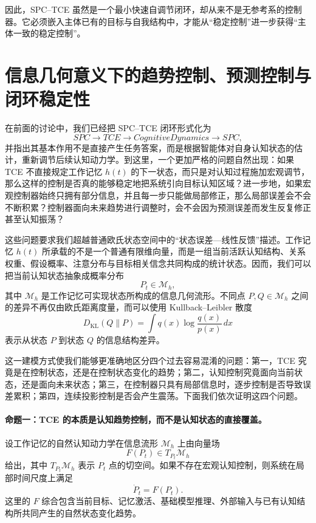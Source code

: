 因此，SPC--TCE 虽然是一个最小快速自调节闭环，却从来不是无参考系的控制器。它必须嵌入主体已有的目标与自我结构中，才能从``稳定控制''进一步获得``主体一致的稳定控制''。

\section{信息几何意义下的趋势控制、预测控制与闭环稳定性}
\label{sec:spc-tce-information-geometric-stability}

在前面的讨论中，我们已经把 SPC--TCE 闭环形式化为
\[
SPC
\rightarrow
TCE
\rightarrow
CognitiveDynamics
\rightarrow
SPC,
\]
并指出其基本作用不是直接产生任务答案，而是根据智能体对自身认知状态的估计，重新调节后续认知动力学。到这里，一个更加严格的问题自然出现：如果 TCE 不直接规定工作记忆 $h(t)$ 的下一状态，而只是对认知过程施加宏观调节，那么这样的控制是否真的能够稳定地把系统引向目标认知区域？进一步地，如果宏观控制器始终只拥有部分信息，并且每一步只能做局部修正，那么局部误差会不会不断积累？控制器面向未来趋势进行调整时，会不会因为预测误差而发生反复修正甚至认知振荡？

这些问题要求我们超越普通欧氏状态空间中的``状态误差---线性反馈''描述。工作记忆 $h(t)$ 所承载的不是一个普通有限维向量，而是一组当前活跃认知结构、关系权重、假设概率、注意分布与目标相关信念共同构成的统计状态。因而，我们可以把当前认知状态抽象成概率分布
\[
P_t\in\mathcal{M}_{h},
\]
其中 $\mathcal{M}_{h}$ 是工作记忆可实现状态所构成的信息几何流形。不同点 $P,Q\in\mathcal{M}_{h}$ 之间的差异不再仅由欧氏距离度量，而可以使用 Kullback--Leibler 散度
\[
D_{\mathrm{KL}}(Q\|P)
=
\int
q(x)
\log
\frac{q(x)}{p(x)}
\,dx
\]
表示从状态 $P$ 到状态 $Q$ 的信息结构差异。

这一建模方式使我们能够更准确地区分四个过去容易混淆的问题：第一，TCE 究竟是在控制状态，还是在控制状态变化的趋势；第二，认知控制究竟面向当前状态，还是面向未来状态；第三，在控制器只具有局部信息时，逐步控制是否导致误差累积；第四，连续投影控制是否会产生震荡。下面我们依次证明这四个问题。

\paragraph{命题一：TCE 的本质是认知趋势控制，而不是认知状态的直接覆盖。}

设工作记忆的自然认知动力学在信息流形 $\mathcal{M}_{h}$ 上由向量场
\[
F(P_t)
\in
T_{P_t}\mathcal{M}_{h}
\]
给出，其中 $T_{P_t}\mathcal{M}_{h}$ 表示 $P_t$ 点的切空间。如果不存在宏观认知控制，则系统在局部时间尺度上满足
\[
\dot P_t
=
F(P_t).
\]
这里的 $F$ 综合包含当前目标、记忆激活、基础模型推理、外部输入与已有认知结构所共同产生的自然状态变化趋势。


